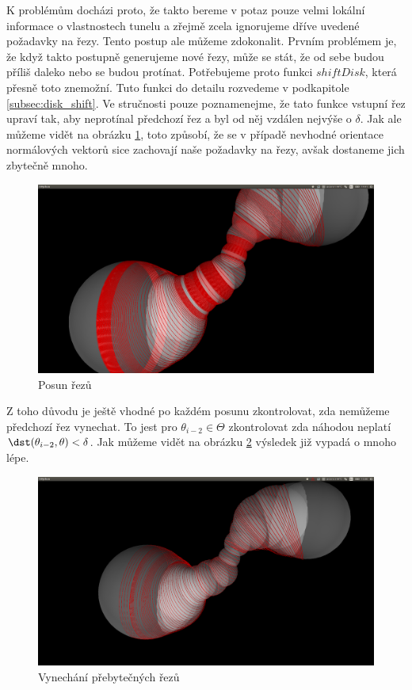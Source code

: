 K problémům docházi proto, že takto bereme v potaz pouze velmi lokální informace o vlastnostech
tunelu a zřejmě zcela ignorujeme dříve uvedené požadavky na řezy. Tento postup ale
můžeme zdokonalit. Prvním problémem je, že když takto postupně generujeme nové řezy,
může se stát, že od sebe budou příliš daleko nebo se budou protínat. Potřebujeme proto
funkci $ shiftDisk $, která přesně toto znemožní. Tuto funkci do detailu rozvedeme v
podkapitole \ref{subsec:disk_shift}. Ve stručnosti pouze poznamenejme, že tato funkce
vstupní řez upraví tak, aby neprotínal předchozí řez a byl od něj vzdálen nejvýše
o $ \delta $. Jak ale můžeme vidět na obrázku \ref{fig:shift_cuts}, toto způsobí,
že se v případě nevhodné orientace normálových vektorů sice zachovají naše
požadavky na řezy, avšak dostaneme jich zbytečně mnoho.

\begin{figure}
    \centering
    \includegraphics[width=\textwidth]{img/shift_cuts.png}
    \caption{Posun řezů}
  \centering
  \label{fig:shift_cuts}
\end{figure}

Z toho důvodu je ještě vhodné po každém posunu zkontrolovat, zda nemůžeme předchozí
řez vynechat. To jest pro $ \theta_{i - 2} \in \Theta $ zkontrolovat zda
náhodou neplatí $ \dst(\theta_{i - 2}, \theta) < \delta $. Jak můžeme vidět na
obrázku \ref{fig:cuts_with_replace} výsledek již vypadá o mnoho lépe.

\begin{figure}
    \centering
    \includegraphics[width=\textwidth]{img/cuts_with_replace.png}
    \caption{Vynechání přebytečných řezů}
  \centering
  \label{fig:cuts_with_replace}
\end{figure}

